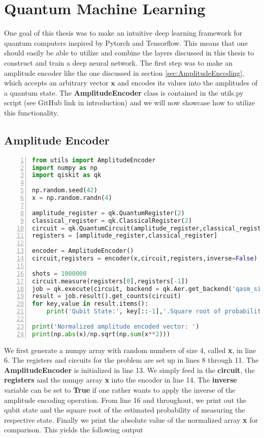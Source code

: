 \section{Quantum Machine Learning}
\label{sec:MethodsML}
One goal of this thesis was to make an intuitive deep learning framework for quantum computers inspired by Pytorch and Tensorflow. This means that one should easily be able to utilize and combine the layers discussed in this thesis to construct and train a deep neural network. The first step was to make an amplitude encoder like the one discussed in section \ref{sec:AmplitudeEncoding}, which accepts an arbitrary vector $\boldsymbol{x}$ and encodes its values into the amplitudes of a quantum state. The \textbf{AmplitudeEncoder} class is contained in the utils.py script (see GitHub link in introduction) and we will now showcase how to utilize this functionality.


\subsection{Amplitude Encoder}
\label{subsec:MethodsAmplitudeEncoder}
\begin{lstlisting}[language=Python,numbers=left]
from utils import AmplitudeEncoder
import numpy as np
import qiskit as qk

np.random.seed(42)
x = np.random.randn(4)

amplitude_register = qk.QuantumRegister(2)
classical_register = qk.ClassicalRegister(2)
circuit = qk.QuantumCircuit(amplitude_register,classical_register)
registers = [amplitude_register,classical_register]

encoder = AmplitudeEncoder()
circuit,registers = encoder(x,circuit,registers,inverse=False)

shots = 1000000
circuit.measure(registers[0],registers[-1])
job = qk.execute(circuit, backend = qk.Aer.get_backend('qasm_simulator'),seed_simulator=42, shots=shots)
result = job.result().get_counts(circuit)
for key,value in result.items():
	print('Qubit State:', key[::-1],'.Square root of probability:', np.sqrt(value/shots))
	
print('Normalized amplitude encoded vector: ')
print(np.abs(x)/np.sqrt(np.sum(x**2)))
\end{lstlisting}
We first generate a numpy array with random numbers of size 4, called \textbf{x}, in line 6. The registers and circuits for the problem are set up in lines 8 through 11. 
The \textbf{AmplitudeEncoder} is initialized in line 13.
We simply feed in the \textbf{circuit}, the \textbf{registers} and the numpy array \textbf{x} into the encoder in line 14. The \textbf{inverse} variable can be set to \textbf{True} if one rather wants to apply the inverse of the amplitude encoding operation. From line 16 and throughout, we print out the qubit state and the square root of the estimated probability of measuring the respective state. Finally we print the absolute value of the normalized array \textbf{x} for comparison. This yields the following output

